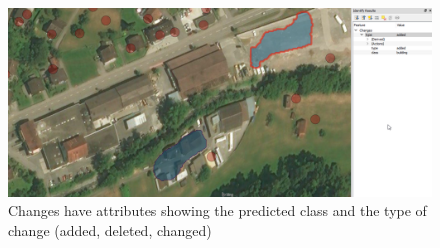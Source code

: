 \begin{figure}[H]
    \centering
	\includegraphics[width=1\linewidth]{chapters/practical_results/images/qgis_changes_attributes.png}
	\caption{Changes have attributes showing the predicted class and the type of change (added, deleted, changed)}
	\label{fig:plugin:change_attributes}
\end{figure}
